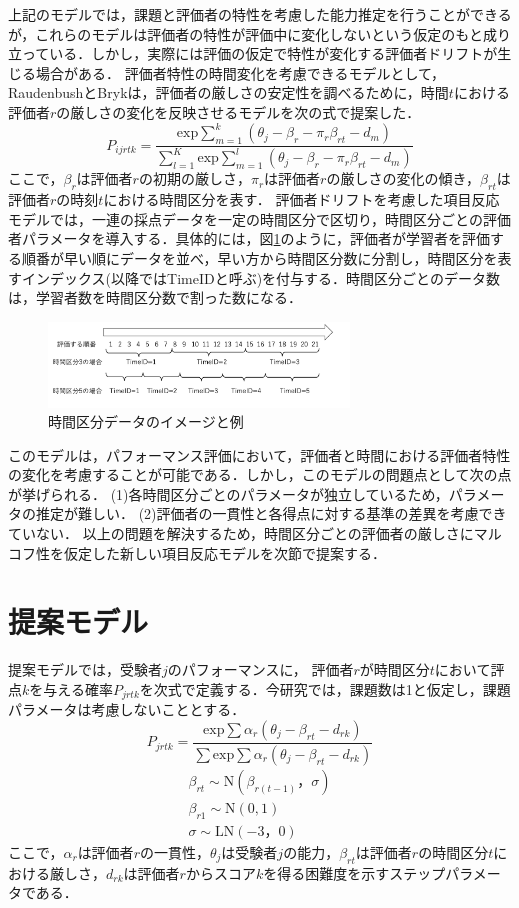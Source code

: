 \documentclass[dvipdfmx, twocolumn, a4paper]{hcresume}
\begin{document}
上記のモデルでは，課題と評価者の特性を考慮した能力推定を行うことができるが，これらのモデルは評価者の特性が評価中に変化しないという仮定のもと成り立っている．しかし，実際には評価の仮定で特性が変化する評価者ドリフトが生じる場合がある．
評価者特性の時間変化を考慮できるモデルとして，RaudenbushとBryk\cite{Raudenbush}は，評価者の厳しさの安定性を調べるために，時間$t$における評価者$r$の厳しさの変化を反映させるモデルを次の式で提案した．
\begin{displaymath}
P_{ijrtk}=\frac{\mathrm{exp}\sum_{m=1}^{k}(\theta_{j}-\beta_{r} - \pi_{r}\beta_{rt}-d_{m})}{\sum_{l=1}^{K}\mathrm{exp}\sum_{m=1}^{l}(\theta_{j}-\beta_{r} - \pi_{r}\beta_{rt}-d_{m})}
\end{displaymath}
ここで，$\beta_{r}$は評価者$r$の初期の厳しさ，$\pi_{r}$は評価者$r$の厳しさの変化の傾き，$\beta_{rt}$は評価者$r$の時刻$t$における時間区分を表す．
評価者ドリフトを考慮した項目反応モデルでは，一連の採点データを一定の時間区分で区切り，時間区分ごとの評価者パラメータを導入する．具体的には，図\ref{timeid}のように，評価者が学習者を評価する順番が早い順にデータを並べ，早い方から時間区分数に分割し，時間区分を表すインデックス(以降ではTimeIDと呼ぶ)を付与する．時間区分ごとのデータ数は，学習者数を時間区分数で割った数になる．
\begin{figure}[t]
 \centering
  \includegraphics[width=8cm]{img/timeid.png}
  \caption{時間区分データのイメージと例}
 \label{timeid}
\end{figure}
このモデルは，パフォーマンス評価において，評価者と時間における評価者特性の変化を考慮することが可能である．しかし，このモデルの問題点として次の点が挙げられる．
(1)各時間区分ごとのパラメータが独立しているため，パラメータの推定が難しい．
(2)評価者の一貫性と各得点に対する基準の差異を考慮できていない．
以上の問題を解決するため，時間区分ごとの評価者の厳しさにマルコフ性を仮定した新しい項目反応モデルを次節で提案する．
\section{提案モデル}
提案モデルでは，受験者$j$のパフォーマンスに， 評価者$r$が時間区分$t$において評点$k$を与える確率$P_{jrtk}$を次式で定義する．今研究では，課題数は1と仮定し，課題パラメータは考慮しないこととする．
\begin{displaymath}
  P_{jrtk}=\frac{\mathrm{exp}\sum{\alpha_r(\theta_{j}-\beta_{rt}-d_{rk})}}{\sum \mathrm{exp}\sum{\alpha_r(\theta_{j}-\beta_{rt}-d_{rk})}}
  \end{displaymath}
  \begin{eqnarray}
    \beta_{rt}\sim \mathrm{N}(\beta_{r(t-1)}，\sigma)\nonumber\\
    \beta_{r1} \sim \mathrm{N}(0,1)\nonumber\\
    \sigma \sim \mathrm{LN}(-3，0)\nonumber
  \end{eqnarray}
ここで，$\alpha_{r}$は評価者$r$の一貫性，$\theta_{j}$は受験者$j$の能力，$\beta_{rt}は$評価者$r$の時間区分$t$における厳しさ，$d_{rk}$は評価者$r$からスコア$k$を得る困難度を示すステップパラメータである．
\end{document}
